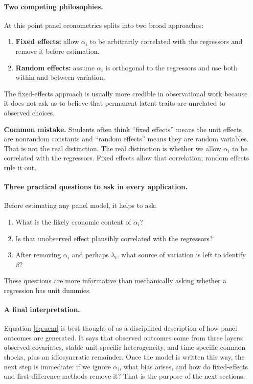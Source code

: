 \paragraph{Two competing philosophies.}
At this point panel econometrics splits into two broad approaches:
\begin{enumerate}
\item \textbf{Fixed effects:} allow $\alpha_i$ to be arbitrarily correlated with the regressors and remove it before estimation.
\item \textbf{Random effects:} assume $\alpha_i$ is orthogonal to the regressors and use both within and between variation.
\end{enumerate}
The fixed-effects approach is usually more credible in observational work because it does not ask us to believe that permanent latent traits are unrelated to observed choices.

\begin{boxF}
\textbf{Common mistake.}
Students often think ``fixed effects'' means the unit effects are nonrandom constants and ``random effects'' means they are random variables. That is not the real distinction. The real distinction is whether we allow $\alpha_i$ to be correlated with the regressors. Fixed effects allow that correlation; random effects rule it out.
\end{boxF}

\paragraph{Three practical questions to ask in every application.}
Before estimating any panel model, it helps to ask:
\begin{enumerate}
\item What is the likely economic content of $\alpha_i$?
\item Is that unobserved effect plausibly correlated with the regressors?
\item After removing $\alpha_i$ and perhaps $\lambda_t$, what source of variation is left to identify $\beta$?
\end{enumerate}
These questions are more informative than mechanically asking whether a regression has unit dummies.

\paragraph{A final interpretation.}
Equation \eqref{eq:uem} is best thought of as a disciplined description of how panel outcomes are generated. It says that observed outcomes come from three layers: observed covariates, stable unit-specific heterogeneity, and time-specific common shocks, plus an idiosyncratic remainder. Once the model is written this way, the next step is immediate: if we ignore $\alpha_i$, what bias arises, and how do fixed-effects and first-difference methods remove it? That is the purpose of the next sections.

